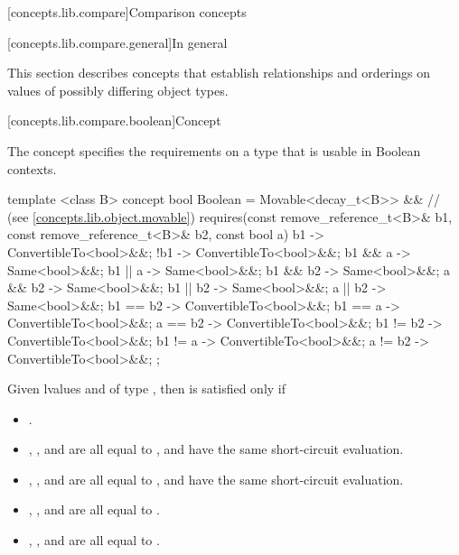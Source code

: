 [concepts.lib.compare]{Comparison concepts}

[concepts.lib.compare.general]{In general}

\pnum
This section describes concepts that establish relationships and orderings
on values of possibly differing object types.

[concepts.lib.compare.boolean]{Concept }

\pnum
The  concept specifies the requirements on a type that is usable in Boolean contexts.

%
\begin{itemdecl}
template <class B>
concept bool Boolean =
  Movable<decay_t<B>> && // (see \ref{concepts.lib.object.movable})
  requires(const remove_reference_t<B>& b1,
           const remove_reference_t<B>& b2, const bool a) {
    { b1 }       -> ConvertibleTo<bool>&&;
    { !b1 }      -> ConvertibleTo<bool>&&;
    { b1 && a }  -> Same<bool>&&;
    { b1 || a }  -> Same<bool>&&;
    { b1 && b2 } -> Same<bool>&&;
    { a && b2  } -> Same<bool>&&;
    { b1 || b2 } -> Same<bool>&&;
    { a || b2  } -> Same<bool>&&;
    { b1 == b2 } -> ConvertibleTo<bool>&&;
    { b1 == a  } -> ConvertibleTo<bool>&&;
    { a == b2  } -> ConvertibleTo<bool>&&;
    { b1 != b2 } -> ConvertibleTo<bool>&&;
    { b1 != a  } -> ConvertibleTo<bool>&&;
    { a != b2  } -> ConvertibleTo<bool>&&;
  };
\end{itemdecl}

\pnum
Given  lvalues  and  of type
, then  is satisfied only if

\begin{itemize}
\item {}.
\item {}, , and
       are all equal to
      , and have the same short-circuit evaluation.
\item {}, , and
       are all equal to
      , and have the same short-circuit evaluation.
\item {}, , and
       are all equal to .
\item {}, , and
       are all equal to .
\end{itemize}

